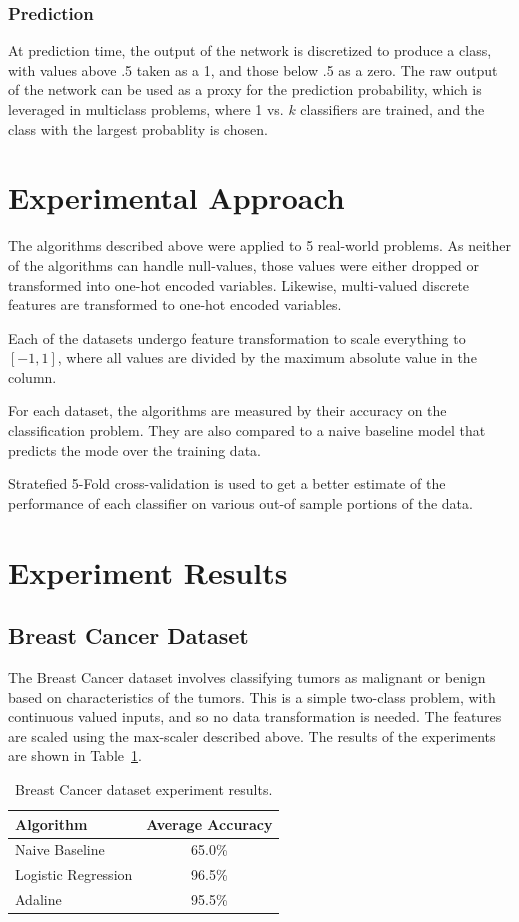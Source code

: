 \documentclass{amsart}
\begin{document}
    \subsubsection*{Prediction}
    At prediction time, the output of the network is discretized to produce a class, with values above .5 taken
    as a 1, and those below .5 as a zero. The raw output of the network can be used as a proxy for the prediction probability,
    which is leveraged in multiclass problems, where 1 vs. $k$ classifiers are trained, and the class with the
    largest probablity is chosen.

    \section{Experimental Approach}
    The algorithms described above were applied to 5 real-world problems. As neither of the algorithms can
    handle null-values, those values were either dropped or transformed into one-hot encoded variables. Likewise,
    multi-valued discrete features are transformed to one-hot encoded variables.

    Each of the datasets undergo feature transformation to scale everything to $[-1,1]$, where
    all values are divided by the maximum absolute value in the column.

    For each dataset, the algorithms are measured by their accuracy on the classification problem. They are also compared
    to a naive baseline model that predicts the mode over the training data.

    Stratefied 5-Fold cross-validation is used to get a better estimate of the performance of each classifier on
    various out-of sample portions of the data.

    \section{Experiment Results}
    \subsection{Breast Cancer Dataset}
    The Breast Cancer dataset\cite{cancerdataset} involves classifying tumors as malignant or benign based
    on characteristics of the tumors. This is a simple two-class problem, with continuous valued inputs, and
    so no data transformation is needed. The features are scaled using the max-scaler described above.
    The results of the experiments are shown in Table~\ref{breast_results}.
    \begin{table}
    \begin{tabular}{lc}
    Algorithm & Average Accuracy \\
    \hline
    Naive Baseline & 65.0\% \\
    Logistic Regression & 96.5\% \\
    Adaline & 95.5\%
    \end{tabular}
    \caption{Breast Cancer dataset experiment results.}
    \label{breast_results}
    \end{table}
\end{document}
